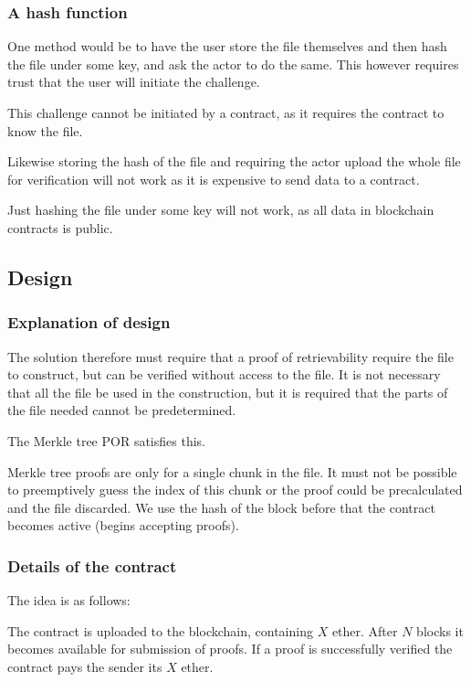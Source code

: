 \documentclass[10pt,twoside,a4paper]{article}
\begin{document}
\subsubsection{A hash function}

One method would be to have the user store the file themselves and then hash the file under some key,
and ask the actor to do the same.
This however requires trust that the user will initiate the challenge.

This challenge cannot be initiated by a contract, as it requires the contract to know the file.

Likewise storing the hash of the file and requiring the actor upload the whole file for verification will not work as
it is expensive to send data to a contract.

Just hashing the file under some key will not work, as all data in blockchain contracts is public.

\subsection{Design}


\subsubsection{Explanation of design}


The solution therefore must require that a proof of retrievability require the file to construct, but can be verified without access to the file.
It is not necessary that all the file be used in the construction, but it is required that the parts of the file needed cannot be predetermined.

The Merkle tree POR satisfies this.

Merkle tree proofs are only for a single chunk in the file.
It must not be possible to preemptively guess the index of this chunk or the proof could be precalculated and the file discarded.
We use the hash of the block before that the contract becomes active (begins accepting proofs).

\subsubsection{Details of the contract}

The idea is as follows:

The contract is uploaded to the blockchain, containing $X$ ether.
After $N$ blocks it becomes available for submission of proofs.
If a proof is successfully verified the contract pays the sender its $X$ ether.
\end{document}
